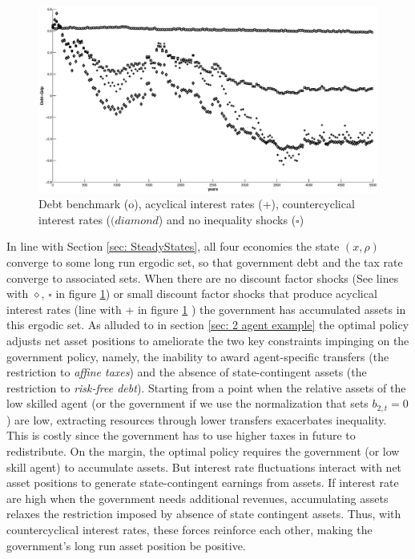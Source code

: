 \documentclass[thmsb,11pt]{article}
\begin{document}
  \begin{figure}[htp]
 \centering
 \includegraphics[width=\textwidth]{Draft25Graphs/LongSimulations.eps}
 \caption{Debt benchmark (o), acyclical interest rates (+), countercyclical interest rates ($(diamond$) and no inequality shocks \scriptsize ($\square$\normalsize) }
 \label{fig:LongSimulations}
 \end{figure}

\smallskip


In line with Section \ref{sec: SteadyStates}, all four economies the state $(x,\rho)$   converge to some long run
ergodic set, so that government debt and the tax rate converge to associated sets. When there are no discount factor shocks
(See lines with {$\diamond$, \scriptsize  $\square$ \normalsize}in figure \ref{fig:LongSimulations}) or small discount factor shocks that produce acyclical interest rates (line with + in figure \ref{fig:LongSimulations} )
the government has accumulated assets in this ergodic set. As alluded to in section \ref{sec: 2 agent example} %
 the optimal policy adjusts  net asset
positions to ameliorate the two key constraints impinging  on the government policy, namely,
the inability to award agent-specific transfers (the restriction to \emph{affine taxes}) and the  absence of state-contingent assets (the
restriction to \emph {risk-free debt}). Starting from a point when the
relative assets of the low skilled agent (or the government if we use the
 normalization that sets $b_{2,t} = 0$) are low, extracting resources through lower
transfers exacerbates inequality. This is costly since the government has to
use higher taxes in future to redistribute. On the margin, the optimal policy requires the government (or low skill agent) to accumulate assets. But  interest rate
fluctuations interact with net asset positions to generate state-contingent  earnings
from assets. If interest rate are high when the government needs additional
revenues, accumulating assets relaxes the restriction imposed by absence
of state contingent assets. Thus, with countercyclical interest rates, these
forces reinforce each other, making the government's  long run asset position be positive.
\end{document}
